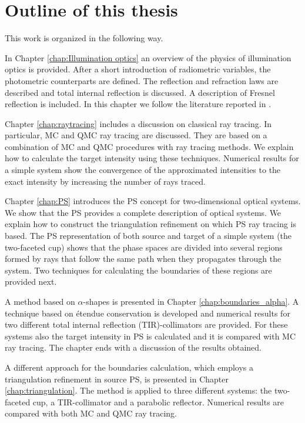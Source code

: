 \section{Outline of this thesis}
This work is organized in the following way.

In Chapter \ref{chap:Illumination optics} an overview of the physics of illumination optics is provided. After a short introduction of radiometric variables, the photometric counterparts are defined. The reflection and refraction laws are described and total internal reflection is discussed. A description of Fresnel reflection is included. In this chapter we follow the literature reported in \cite{hecht1998hecht, feynman2011feynman, feynman1964feynman}.

Chapter \ref{chap:raytracing} includes a discussion on classical ray tracing. In particular, MC and QMC ray tracing are discussed. They are based on a combination of MC and QMC procedures with ray tracing methods. We explain how to calculate the target intensity using these techniques. Numerical results for a simple system show the convergence of the approximated intensities to the exact intensity by increasing the number of rays traced.

Chapter \ref{chap:PS} introduces the PS concept for two-dimensional optical systems. We show that the PS provides a complete description of optical systems. We explain how to construct the triangulation refinement on which PS ray tracing is based. The PS representation of both source and target of a simple system (the two-faceted cup) shows that the phase spaces are divided into several regions formed by rays that follow the same path when they propagates through the system. Two techniques for calculating the boundaries of these regions are provided next. 
 
A method based on $\alpha$-shapes is presented in Chapter \ref{chap:boundaries_alpha}. A technique based on \'{e}tendue conservation is developed and numerical results for two different total internal reflection (TIR)-collimators are provided. For these systems also the target intensity in PS is calculated and it is compared with MC ray tracing. The chapter ends with a discussion of the results obtained.

A different approach for the boundaries calculation, which employs a triangulation refinement in source PS, is presented in Chapter \ref{chap:triangulation}. The method is applied to three different systems: the two-faceted cup, a TIR-collimator and a parabolic reflector. Numerical results are compared with both MC and QMC ray tracing.

